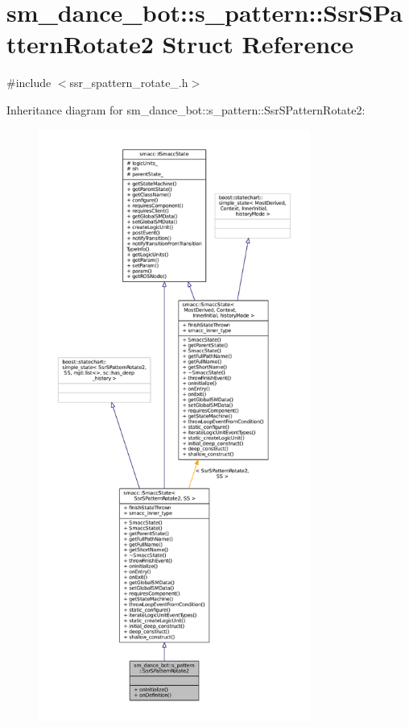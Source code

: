 \hypertarget{structsm__dance__bot_1_1s__pattern_1_1SsrSPatternRotate2}{}\section{sm\+\_\+dance\+\_\+bot\+:\+:s\+\_\+pattern\+:\+:Ssr\+S\+Pattern\+Rotate2 Struct Reference}
\label{structsm__dance__bot_1_1s__pattern_1_1SsrSPatternRotate2}


{\ttfamily \#include $<$ssr\+\_\+spattern\+\_\+rotate\+\_.\+h$>$}



Inheritance diagram for sm\+\_\+dance\+\_\+bot\+:\+:s\+\_\+pattern\+:\+:Ssr\+S\+Pattern\+Rotate2\+:
\nopagebreak
\begin{figure}[H]
\begin{center}
\leavevmode
\includegraphics[height=550pt]{structsm__dance__bot_1_1s__pattern_1_1SsrSPatternRotate2__inherit__graph}
\end{center}
\end{figure}



